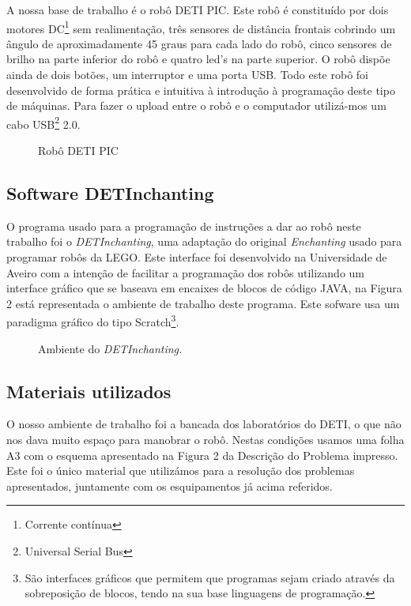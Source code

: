 \documentclass[a4paper, 12pt, onecolumn, oneside]{report}
\begin{document}
A nossa base de trabalho é o robô DETI PIC. Este robô é constituído por dois motores DC\footnote{Corrente contínua} sem realimentação, três sensores de distância frontais cobrindo um ângulo de aproximadamente 45 graus para cada lado do robô, cinco sensores de brilho na parte inferior do robô e quatro led's na parte superior. O robô dispõe ainda de dois botões, um interruptor e uma porta USB. Todo este robô foi desenvolvido de forma prática e intuitiva à introdução à programação deste tipo de máquinas. 
Para fazer o upload entre o robô e o computador utilizá-mos um cabo USB\footnote{Universal Serial Bus} 2.0.



\begin{figure}[H] 
\caption{Robô DETI PIC}
\label{fig:speciation}
\end{figure}


\subsection{Software DETInchanting}

O programa usado para a programação de instruções a dar ao robô neste trabalho foi o \emph{DETInchanting}, uma adaptação do original \emph{Enchanting} usado para programar robôs da LEGO. Este interface foi desenvolvido na Universidade de Aveiro com a intenção de facilitar a programação dos robôs utilizando um interface gráfico que se baseava em encaixes de blocos de código JAVA, na Figura 2 está representada o ambiente de trabalho deste programa. Este sofware usa um paradigma gráfico do tipo Scratch\footnote{São interfaces gráficos que permitem que programas sejam criado através da sobreposição de blocos, tendo na sua base linguagens de programação.}.



\begin{figure}[H] 
\caption{Ambiente do \emph{DETInchanting.}}
\label{fig:speciation}
\end{figure}




\subsection{Materiais utilizados}

O nosso ambiente de trabalho foi a bancada dos laboratórios do DETI, o que não nos dava muito espaço para manobrar o robô. Nestas condições usamos uma folha A3 com o esquema apresentado na Figura 2 da Descrição do Problema impresso. Este foi o único material que utilizámos para a resolução dos problemas apresentados, juntamente com os esquipamentos já acima referidos. 
 
\end{document}
